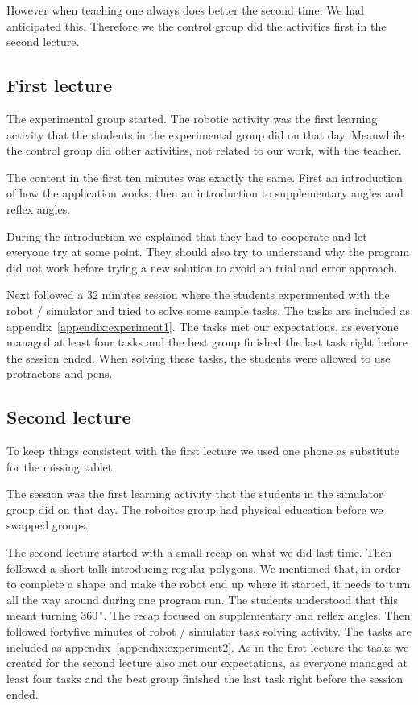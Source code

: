 However when teaching one always does better the second time. We had anticipated this. Therefore we the control group did the activities first in the second lecture.

\subsection*{First lecture}
The experimental group started. The robotic activity was the first learning activity that the students in the experimental group did on that day. 
Meanwhile the control group did other activities, not related to our work, with the teacher.

\bigskip\noindent
The content in the first ten minutes was exactly the same. First an introduction of how the application works, then an introduction to supplementary angles and reflex angles. 

\bigskip\noindent
During the introduction we explained that they had to cooperate and let everyone try at some point. They should also try to understand why the program did not work before trying a new solution to avoid an trial and error approach.

\bigskip\noindent
Next followed a 32 minutes session where the students experimented with the robot / simulator and tried to solve some sample tasks. The tasks are included as appendix~\ref{appendix:experiment1}.
The tasks met our expectations, as everyone managed at least four tasks and the best group finished the last task right before the session ended. When solving these tasks, the students were allowed to use protractors and pens. 

\subsection*{Second lecture}
To keep things consistent with the first lecture we used one phone as substitute for the missing tablet.

\bigskip\noindent
The session was the first learning activity that the students in the simulator group did on that day. 
The roboitcs group had physical education before we swapped groups.

\bigskip\noindent
The second lecture started with a small recap on what we did last time. Then followed a short talk introducing regular polygons. We mentioned that, in order to complete a shape and make the robot end up where it started, it needs to turn all the way around during one program run. The students understood that this meant turning $360\,^{\circ}$. The recap focused on supplementary and reflex angles. Then followed fortyfive minutes of robot / simulator task solving activity. The tasks are included as appendix~\ref{appendix:experiment2}.
As in the first lecture the tasks we created for the second lecture also met our expectations, as everyone managed at least four tasks and the best group finished the last task right before the session ended. 